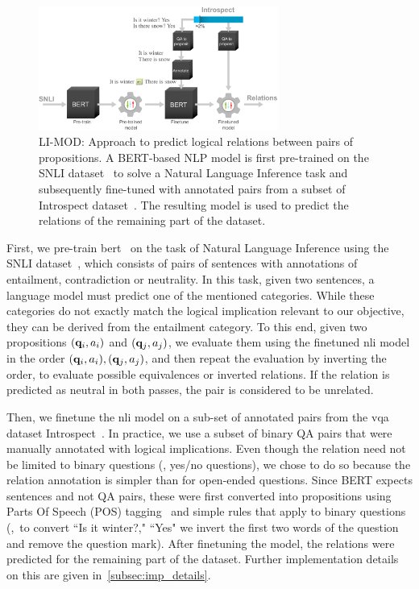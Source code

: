\begin{figure}[!t]
\centering
\includegraphics[width=0.7\textwidth]{Figures/Part2_Consist/02_logic/bert_relations.pdf}
    \caption{LI-MOD: Approach to predict logical relations between pairs of propositions. A BERT-based NLP model is first pre-trained on the SNLI dataset~\cite{young2014image} to solve a Natural Language Inference task and subsequently fine-tuned with annotated pairs from a subset of Introspect dataset~\cite{selvaraju2020squinting}. The resulting model is used to predict the relations of the remaining part of the dataset.}
\label{fig:relation_prediction}
\end{figure}

First, we pre-train \gls{bert}~\cite{devlin2018bert} on the task of Natural Language Inference using the SNLI dataset~\cite{young2014image}, which consists of pairs of sentences with annotations of entailment, contradiction or neutrality. In this task, given two sentences, a language model must predict one of the mentioned categories. While these categories do not exactly match the logical implication relevant to our objective, they can be derived from the entailment category. To this end, given two propositions $(\mathbf{q}_i,a_i)$ and $(\mathbf{q}_j,a_j)$, we evaluate them using the finetuned \gls{nli} model in the order $(\mathbf{q}_i,a_i),(\mathbf{q}_j,a_j)$, and then repeat the evaluation by inverting the order, to evaluate possible equivalences or inverted relations. If the relation is predicted as neutral in both passes, the pair is considered to be unrelated.

Then, we finetune the \gls{nli} model on a sub-set of annotated pairs from the \gls{vqa} dataset Introspect~\cite{selvaraju2020squinting}. In practice, we use a subset of binary QA pairs that were manually annotated with logical implications. Even though the relation need not be limited to binary questions (\ie, yes/no questions), we chose to do so because the relation annotation is simpler than for open-ended questions. Since BERT expects sentences and not QA pairs, these were first converted into propositions using Parts Of Speech (POS) tagging~\cite{petrov2011universal} and simple rules that apply to binary questions (\eg,~to convert ``Is it winter?," ``Yes" we invert the first two words of the question and remove the question mark). 
After finetuning the model, the relations were predicted for the remaining part of the dataset. Further implementation details on this are given in~\ref{subsec:imp_details}.
